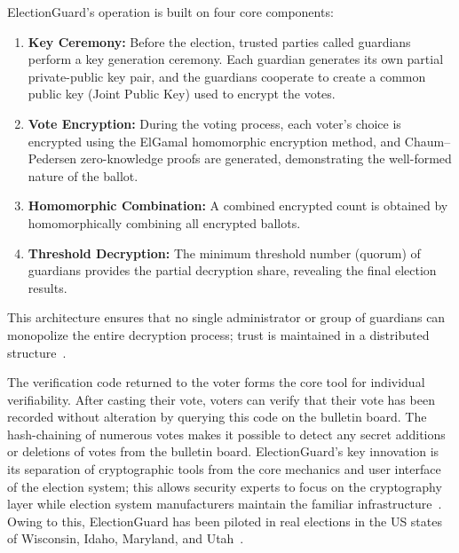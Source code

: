 \documentclass[a4paper,fleqn]{cas-sc}
\begin{document}
ElectionGuard's operation is built on four core components:

\begin{enumerate}
    \item \textbf{Key Ceremony:} Before the election, trusted parties called guardians perform a key generation ceremony. Each guardian generates its own partial private-public key pair, and the guardians cooperate to create a common public key (Joint Public Key) used to encrypt the votes.
    \item \textbf{Vote Encryption:} During the voting process, each voter's choice is encrypted using the ElGamal homomorphic encryption method, and Chaum--Pedersen zero-knowledge proofs are generated, demonstrating the well-formed nature of the ballot.
    \item \textbf{Homomorphic Combination:} A combined encrypted count is obtained by homomorphically combining all encrypted ballots.
    \item \textbf{Threshold Decryption:} The minimum threshold number (quorum) of guardians provides the partial decryption share, revealing the final election results.
\end{enumerate}
This architecture ensures that no single administrator or group of guardians can monopolize the entire decryption process; trust is maintained in a distributed structure~\cite{EGSpec2024}.


The verification code returned to the voter forms the core tool for individual verifiability. After casting their vote, voters can verify that their vote has been recorded without alteration by querying this code on the bulletin board. The hash-chaining of numerous votes makes it possible to detect any secret additions or deletions of votes from the bulletin board. ElectionGuard's key innovation is its separation of cryptographic tools from the core mechanics and user interface of the election system; this allows security experts to focus on the cryptography layer while election system manufacturers maintain the familiar infrastructure~\cite{Benaloh2024}. Owing to this, ElectionGuard has been piloted in real elections in the US states of Wisconsin, Idaho, Maryland, and Utah~\cite{EAC2022}.
\end{document}
